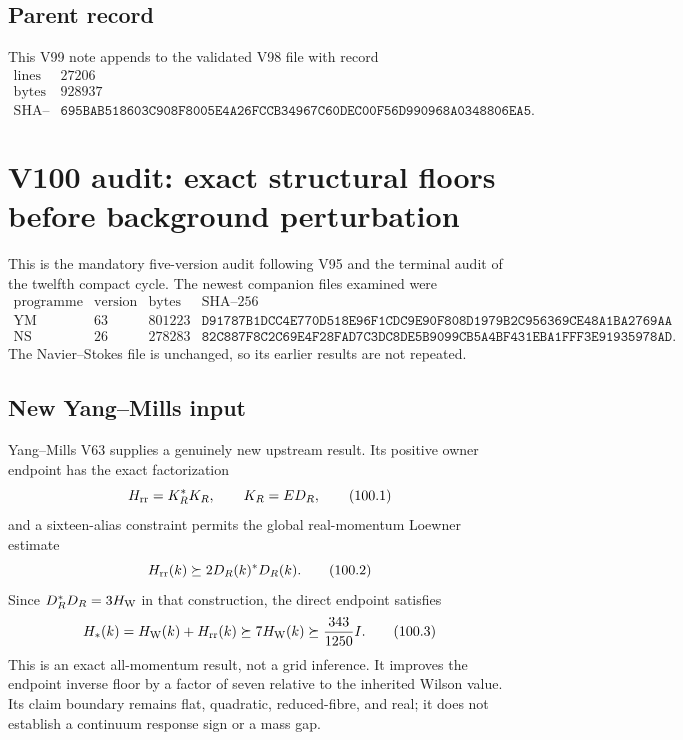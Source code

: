 \documentclass[11pt]{article}
\theoremstyle{remark}
\begin{document}
\subsection{Parent record}

This V99 note appends to the validated V98 file with record
\[
\begin{array}{c|c}
\text{lines}&27206\\
\text{bytes}&928937\\
\text{SHA--256}&
\texttt{695BAB518603C908F8005E4A26FCCB34967C60DEC00F56D990968A0348806EA5}.
\end{array}
\]



\section{V100 audit: exact structural floors before background
perturbation}
\label{sec:v12v100}

This is the mandatory five-version audit following V95 and the
terminal audit of the twelfth compact cycle.  The newest companion
files examined were
\[
\begin{array}{c|c|c|c}
\text{programme}&\text{version}&\text{bytes}&\text{SHA--256}\\ \hline
\mathrm{YM}&63&801223&
\texttt{D91787B1DCC4E770D518E96F1CDC9E90F808D1979B2C956369CE48A1BA2769AA}\\
\mathrm{NS}&26&278283&
\texttt{82C887F8C2C69E4F28FAD7C3DC8DE5B9099CB5A4BF431EBA1FFF3E91935978AD}.
\end{array}
\]
The Navier--Stokes file is unchanged, so its earlier results are not
repeated.

\subsection{New Yang--Mills input}

Yang--Mills V63 supplies a genuinely new upstream result.  Its
positive owner endpoint has the exact factorization
\[
 H_{\rm rr}=K_R^*K_R,\qquad K_R=ED_R,                            \tag{100.1}
\]
and a sixteen-alias constraint permits the global real-momentum
Loewner estimate
\[
 H_{\rm rr}(k)\succeq2D_R(k)^*D_R(k).                            \tag{100.2}
\]
Since \(D_R^*D_R=3H_{\rm W}\) in that construction, the direct
endpoint satisfies
\[
 H_*(k)=H_{\rm W}(k)+H_{\rm rr}(k)
 \succeq7H_{\rm W}(k)
 \succeq\frac{343}{1250}I.                                     \tag{100.3}
\]
This is an exact all-momentum result, not a grid inference.  It
improves the endpoint inverse floor by a factor of seven relative to
the inherited Wilson value.  Its claim boundary remains flat,
quadratic, reduced-fibre, and real; it does not establish a
continuum response sign or a mass gap.
\end{document}
